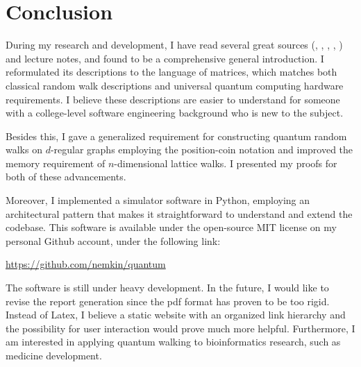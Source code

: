 \chapter{Conclusion}

During my research and development, I have read several great sources (\cite{Aharonov}, \cite{KempeIntroduction}, \cite{Portugal}, \cite{Santha}, \cite{XiaReview}) and lecture notes, and found \cite{Portugal} to be a comprehensive general introduction. I reformulated its descriptions to the language of matrices, which matches both classical random walk descriptions and universal quantum computing hardware requirements. I believe these descriptions are easier to understand for someone with a college-level software engineering background who is new to the subject.

Besides this, I gave a generalized requirement for constructing quantum random walks on $d$-regular graphs employing the position-coin notation and improved the memory requirement of $n$-dimensional lattice walks. I presented my proofs for both of these advancements.

Moreover, I implemented a simulator software in Python, employing an architectural pattern that makes it straightforward to understand and extend the codebase. This software is available under the open-source MIT license on my personal Github account, under the following link:

\url{https://github.com/nemkin/quantum}

The software is still under heavy development. In the future, I would like to revise the report generation since the pdf format has proven to be too rigid. Instead of Latex, I believe a static website with an organized link hierarchy and the possibility for user interaction would prove much more helpful. Furthermore, I am interested in applying quantum walking to bioinformatics research, such as medicine development.
